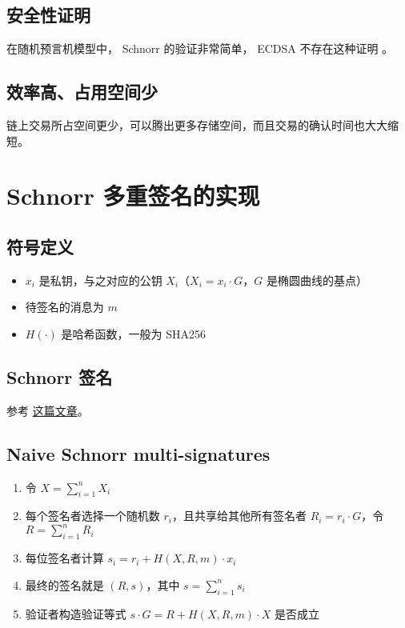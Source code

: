 \documentclass[a4paper,10pt]{article}
\begin{document}
\subsection{安全性证明}

在随机预言机模型中， Schnorr 的验证非常简单， ECDSA 不存在这种证明 \cite{seurin2012exact}。

\subsection{效率高、占用空间少}

链上交易所占空间更少，可以腾出更多存储空间，而且交易的确认时间也大大缩短。

\section{Schnorr 多重签名的实现}
\subsection{符号定义}
\begin{itemize}
  \item \(x_i\) 是私钥，与之对应的公钥 \(X_i\)（\(X_i=x_i\cdot G\)，\(G\) 是椭圆曲线的基点）
  \item 待签名的消息为 \(m\)
  \item \(H(\cdot)\) 是哈希函数，一般为 SHA256
\end{itemize}

\subsection{Schnorr 签名}

参考 \href{https://sammyne.github.io/2020/10/19/schnorr-protocol-zero-knowledge-proof-and-digital-sig/}{这篇文章}。

\subsection{Naive Schnorr multi-signatures}
\begin{enumerate}
  \item 令 \(X=\sum_{i=1}^n X_i\)
  \item 每个签名者选择一个随机数 \(r_i\)，且共享给其他所有签名者 \(R_i=r_i\cdot G\)，令 \(R=\sum_{i=1}^n R_i\)
  \item 每位签名者计算 \(s_i=r_i+H(X,R,m)\cdot x_i\)
  \item 最终的签名就是 \((R,s)\)，其中 \(s=\sum_{i=1}^n s_i\)
  \item 验证者构造验证等式 \(s\cdot G=R+H(X,R,m)\cdot X\) 是否成立
\end{enumerate}
\end{document}
